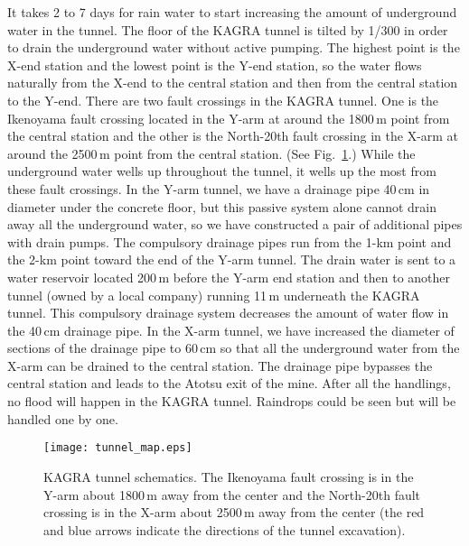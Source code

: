 \documentclass[prd ,twocolumn ,secnumarabic,dvips
,amssymb, amsmath,nobibnotes, aps, prd,superscriptaddress]{revtex4-1}
\begin{document}
{It takes 2 to 7 days for rain water to start increasing the amount of underground water in the tunnel. 
The floor of the KAGRA tunnel is tilted by 1/300 in order to drain the underground water without active pumping.
The highest point is the X-end station and the lowest point is the Y-end station, so the water flows naturally from the X-end to the central station and then from the central station to the Y-end.
There are two fault crossings in the KAGRA tunnel.
One is the Ikenoyama fault crossing located in the Y-arm at around the 1800\,m point from the central station and the other is the North-20th fault crossing in the X-arm at around the 2500\,m point from the central station. (See Fig.~\ref{fig:faultcrossings}.)
While the underground water wells up throughout the tunnel, it wells up the most from these fault crossings.
In the Y-arm tunnel, we have a drainage pipe 40\,cm in diameter under the concrete floor, but this passive system alone cannot drain away all the underground water, so we have constructed a pair of additional pipes with drain pumps. 
The compulsory drainage pipes run from the 1-km point and the 2-km point toward the end of the Y-arm tunnel. 
The drain water is sent to a water reservoir located 200\,m before the Y-arm end station and then to another tunnel (owned by a local company) running 11\,m underneath the KAGRA tunnel.
This compulsory drainage system decreases the amount of water flow in the 40\,cm drainage pipe.
In the X-arm tunnel, we have increased the diameter of sections of the drainage pipe to 60\,cm so that all the underground water from the X-arm can be drained to the central station.
The drainage pipe bypasses the central station and leads to the Atotsu exit of the mine.
After all the handlings, no flood will happen in the KAGRA tunnel. Raindrops could be seen but will be handled one by one.

\begin{figure}[htbp]
	\begin{center}
		\texttt{[image: tunnel\_map.eps]}
		\caption{\label{fig:faultcrossings}KAGRA tunnel schematics. The Ikenoyama fault crossing is in the Y-arm about 1800\,m away from the center and the North-20th fault crossing is in the X-arm about 2500\,m away from the center (the red and blue arrows indicate the directions of the tunnel excavation).}
	\end{center}
\end{figure}

}
\end{document}
